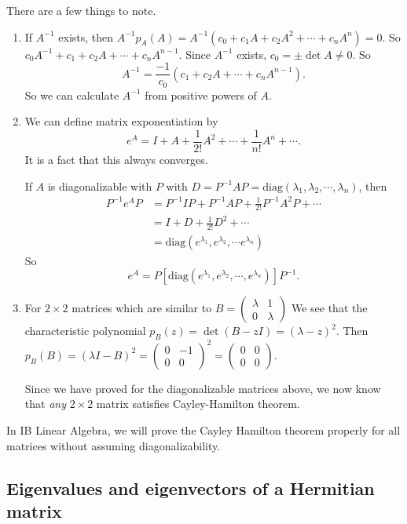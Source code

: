 \documentclass[a4paper]{article}
\begin{document}
There are a few things to note.
\begin{enumerate}
  \item If $A^{-1}$ exists, then $A^{-1} p_A(A) = A^{-1}(c_0 + c_1A + c_2A^2 + \cdots + c_n A^n) = 0$. So $c_0 A^{-1} + c_1 + c_2A + \cdots + c_n A^{n - 1}$. Since $A^{-1}$ exists, $c_0 = \pm \det A \not= 0$. So
    \[
      A^{-1} = \frac{-1}{c_0}(c_1 + c_2 A + \cdots + c_n A^{n -1}).
    \]
    So we can calculate $A^{-1}$ from positive powers of $A$.
  \item We can define matrix exponentiation by
    \[
      e^A = I + A + \frac{1}{2!}A^2 + \cdots + \frac{1}{n!}A^n + \cdots.
    \]
    It is a fact that this always converges.

    If $A$ is diagonalizable with $P$ with $D = P^{-1}AP = \mathrm{diag}(\lambda_1, \lambda_2, \cdots, \lambda_n)$, then
    \begin{align*}
      P^{-1}e^A P &= P^{-1}IP + P^{-1}AP + \frac{1}{2!}P^{-1}A^2P + \cdots\\
      &= I + D + \frac{1}{2!}D^{2} + \cdots\\
      &= \mathrm{diag}(e^{\lambda_1}, e^{\lambda_2}, \cdots e^{\lambda_n})
    \end{align*}
    So
    \[
      e^A = P[\mathrm{diag}(e^{\lambda_1}, e^{\lambda_2}, \cdots, e^{\lambda_n})]P^{-1}.
    \]
  \item For $2\times 2$ matrices which are similar to $B =
    \begin{pmatrix}
      \lambda & 1\\
      0 & \lambda
    \end{pmatrix}$
    We see that the characteristic polynomial $p_B(z) = \det (B - zI) = (\lambda - z)^2$. Then $p_B(B) = (\lambda I - B)^2 =
    \begin{pmatrix}
      0 & -1\\
      0 & 0
    \end{pmatrix}^2 =
    \begin{pmatrix}
      0 & 0\\
      0 & 0
    \end{pmatrix}$.

    Since we have proved for the diagonalizable matrices above, we now know that \emph{any} $2\times 2$ matrix satisfies Cayley-Hamilton theorem.
\end{enumerate}
In IB Linear Algebra, we will prove the Cayley Hamilton theorem properly for all matrices without assuming diagonalizability.

\subsection{Eigenvalues and eigenvectors of a Hermitian matrix}
\end{document}
